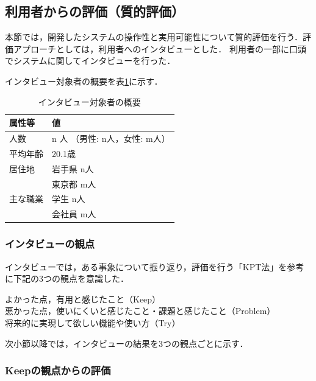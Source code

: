 \documentclass{jsarticle}
\begin{document}
\subsection{利用者からの評価（質的評価）}

本節では，開発したシステムの操作性と実用可能性について質的評価を行う．評価アプローチとしては，利用者へのインタビューとした．
利用者の一部に口頭でシステムに関してインタビューを行った．

インタビュー対象者の概要を表\ref{attribute_interview}に示す．

\begin{table}[ht!]
\small
\caption{インタビュー対象者の概要}
\begin{center}
\begin{tabular}{ll}
\label{attribute_interview}
属性等      & 値 \\ \hline
人数        & n 人 （男性: n人，女性: m人）\\
平均年齢    & 20.1歳 \\
居住地      & 岩手県 n人 \\
            & 東京都 m人 \\
主な職業    & 学生 n人   \\
            & 会社員 m人 \\
\end{tabular}
\end{center}
\end{table}

\subsubsection{インタビューの観点}

インタビューでは，ある事象について振り返り，評価を行う「KPT法」を参考に下記の3つの観点を意識した．

\begin{description}
\item[よかった点，有用と感じたこと（Keep）] 
\item[悪かった点，使いにくいと感じたこと・課題と感じたこと（Problem）] 
\item[将来的に実現して欲しい機能や使い方（Try）] 
\end{description}

次小節以降では，インタビューの結果を3つの観点ごとに示す．

\subsubsection{Keepの観点からの評価}
\end{document}
